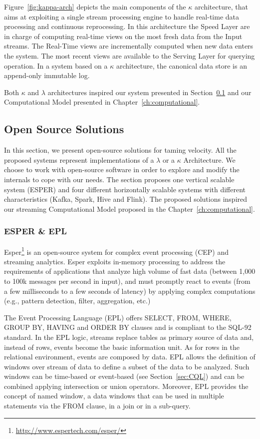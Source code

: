 Figure~\ref{fig:kappa-arch} depicts the main components of the $\kappa$ architecture, that aims at exploiting a single stream processing engine to handle real-time data processing and continuous reprocessing.
In this architecture the Speed Layer are in charge of computing real-time views on the most fresh data from the Input streams. The Real-Time views are incrementally computed when new data enters the system.
The most recent views are available to the Serving Layer for querying operation.
In a system based on a $\kappa$ architecture, the canonical data store is an append-only immutable log.

Both $\kappa$ and $\lambda$ architectures inspired our system presented in Section~\ref{sec:vel-sol} and our Computational Model presented in Chapter~\ref{ch:computational}.

\subsection{Open Source Solutions} \label{sec:vel-sol}
In this section, we present open-source solutions for taming velocity. All the proposed systems represent implementations of a $\lambda$ or a $\kappa$ Architecture. 
We choose to work with open-source software in order to explore and modify the internals to cope with our needs.
The section proposes one vertical scalable system (ESPER) and four different horizontally scalable systems with different characteristics (Kafka, Spark, Hive and Flink).
The proposed solutions inspired our streaming Computational Model proposed in the Chapter~\ref{ch:computational}.

\subsubsection{ESPER \& EPL} \label{sec:esper-epl}
Esper\footnote{\url{http://www.espertech.com/esper/}} is an open-source system for complex event processing (CEP) and streaming analytics. 
Esper exploits in-memory processing to address the requirements of applications that analyze high volume of fast data (between 1,000 to 100k messages per second in input), and must promptly react to events (from a few milliseconds to a few seconds of latency) by applying complex computations (e.g., pattern detection, filter, aggregation, etc.)

The Event Processing Language (EPL) offers SELECT, FROM, WHERE, GROUP BY, HAVING and ORDER BY clauses and is compliant to the SQL-92 standard.
In the EPL logic, streams replace tables as primary source of data and, instead of rows, events become the basic information unit. As for rows in the relational environment, events are composed by data.
EPL allows the definition of windows over stream of data to define a subset of the data to be analyzed. Such windows can be time-based or event-based (see Section~\ref{sec:CQL}) and can be combined applying intersection or union operators. Moreover, EPL provides the concept of named window, a data windows that can be used in multiple statements via the FROM clause, in a join or in a sub-query. 

